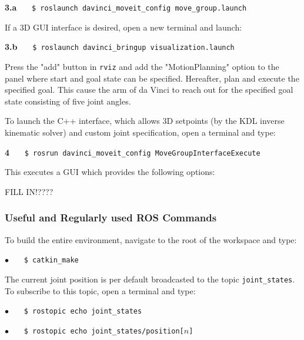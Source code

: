 \hspace{1cm} \textbf{3.a} \ \ \  \texttt{\$ roslaunch davinci\_moveit\_config move\_group.launch} \ \ \ {} 

If a 3D GUI interface is desired, open a new terminal and launch:

\hspace{1cm} \textbf{3.b} \ \ \  \texttt{\$ roslaunch davinci\_bringup visualization.launch} \ \ \ {} 

Press the "add" button in \texttt{rviz} and add the "MotionPlanning" option to the panel where start and goal state can be specified. Hereafter, plan and execute the specified goal. This cause the arm of da Vinci to reach out for the specified goal state consisting of five joint angles.

To launch the C++ interface, which allows 3D setpoints (by the KDL inverse kinematic solver) and custom joint specification, open a terminal and type:

\hspace{1cm} \textbf{4} \ \ \  \texttt{\$ rosrun davinci\_moveit\_config MoveGroupInterfaceExecute} \ \ \ {\color{RoyalBlue}{\textit{}}} 

This executes a GUI which provides the following options:

FILL IN!????

\subsubsection*{Useful and Regularly used ROS Commands}
To build the entire environment, navigate to the root of the workspace and type:

\hspace{1cm} \textbf{$\bullet$} \ \ \  \texttt{\$ catkin\_make}%

The current joint position is per default broadcasted to the topic \texttt{joint\_states}. To subscribe to this topic, open a terminal and type:

\hspace{1cm} \textbf{$\bullet$} \ \ \  \texttt{\$ rostopic echo joint\_states} \ \ \ {} 

\hspace{1cm} \textbf{$\bullet$} \ \ \  \texttt{\$ rostopic echo joint\_states/position[$n$]} \ \ \  {} 

